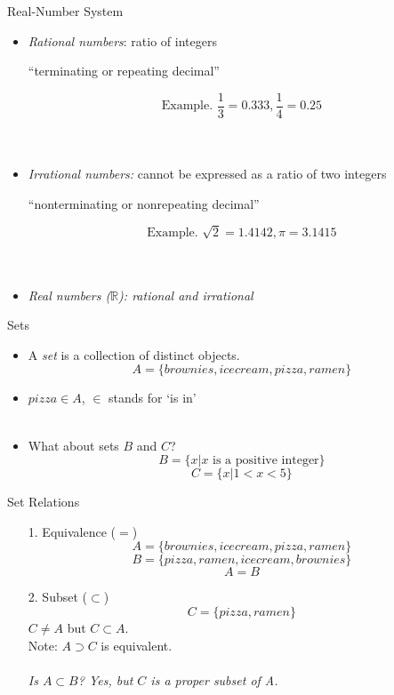 \documentclass{./../../Latex/teaching_slides}
\begin{document}
\begin{frame}{Real-Number System}
\vspace{-0.15em} 
\begin{itemize}
\item \textit{Rational numbers}: ratio of integers 
\item[] \hspace{0.5em} ``terminating or repeating decimal''
\vspace{-0.15em} 
\item[] $$\text{Example. } \frac{1}{3}=0.333, \frac{1}{4}=0.25$$ \\~\\
\vspace{-0.15em} 
\item \pause \textit{Irrational numbers:} cannot be expressed as a ratio of two integers
\item[] \hspace{0.5em} ``nonterminating or nonrepeating decimal'' 
\vspace{-0.15em} 
\item[] $$\text{Example. } \sqrt{2}=1.4142, \pi=3.1415$$ \\~\\
\vspace{-0.15em} 
\item \pause \textit{Real numbers ($\mathbb{R}$): rational and irrational}
\end{itemize}
\end{frame}


\begin{frame}{Sets}
\begin{itemize}
\item A \textit{set} is a collection of distinct objects.
$$ A = \{brownies, icecream, pizza, ramen\} $$
\item $pizza \in A$, $\in$ stands for `is in' \\~\\
\item \pause What about sets $B$ and $C$?
$$ B = \{x | x \text{ is a positive integer}\}$$
$$ C = \{x | 1<x<5\}$$
\end{itemize}
\end{frame}

\begin{frame}{Set Relations}
\begin{itemize}
\item[1.] Equivalence ($=$)
$$ A = \{brownies, icecream, pizza, ramen\} $$
$$ B = \{pizza, ramen, icecream, brownies\} $$
$$ A = B $$
\item[2.] \pause Subset ($\subset$)
$$ C = \{pizza, ramen\} $$
$ C \neq A$ but $ C \subset A$. \\ Note: $A \supset C$ is equivalent. \\~\\
\pause \textit{Is $A \subset B$? \pause Yes, but $C$ is a proper subset of A.}
\end{itemize}
\end{frame}
\end{document}
